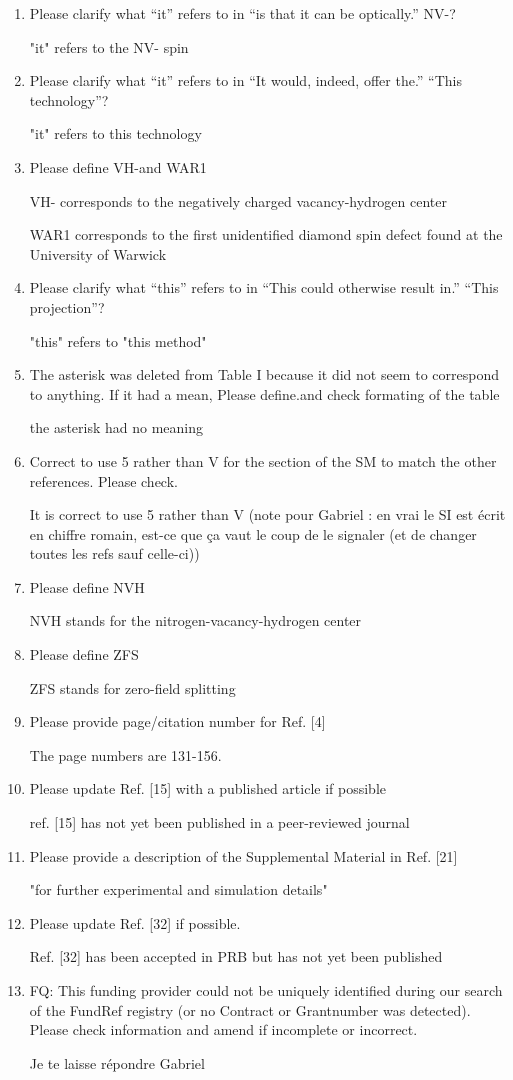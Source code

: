 \documentclass{article}
\begin{document}
\begin{enumerate}
\item   Please clarify what “it” refers to in “is that it can be optically.” NV-?

"it" refers to the NV- spin
\item   Please clarify what “it” refers to in “It would, indeed, offer the.” “This technology”?

"it" refers to this technology
\item   Please define VH-and WAR1

VH- corresponds to the negatively charged vacancy-hydrogen center

WAR1 corresponds to the first unidentified diamond spin defect found at the University of Warwick
\item   Please clarify what “this” refers to in “This could otherwise result in.” “This projection”?

"this" refers to "this method"
\item   The asterisk was deleted from Table I because it did not seem to correspond to anything. If it had a mean, Please define.and check formating of the table

the asterisk had no meaning
\item   Correct to use 5 rather than V for the section of the SM to match the other references. Please check.

It is correct to use 5 rather than V (note pour Gabriel : en vrai le SI est écrit en chiffre romain, est-ce que ça vaut le coup de le signaler (et de changer toutes les refs sauf celle-ci))
\item   Please define NVH

NVH stands for the nitrogen-vacancy-hydrogen center
\item   Please define ZFS

ZFS stands for zero-field splitting
\item   Please provide page/citation number for Ref. [4]

The page numbers are 131-156.
\item   Please update Ref. [15] with a published article if possible

ref. [15] has not yet been published in a peer-reviewed journal
\item   Please provide a description of the Supplemental Material in Ref. [21]

"for further experimental and simulation details"
\item   Please update Ref. [32] if possible.

Ref. [32] has been accepted in PRB but has not yet been published
\item   FQ: This funding provider could not be uniquely identified during our search of the FundRef registry (or no Contract or Grantnumber was detected). Please check information and amend if incomplete or incorrect.

Je te laisse répondre Gabriel


\end{enumerate}
\end{document}
